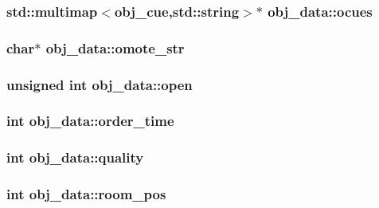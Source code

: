 \hypertarget{structobj__data_a9252063584afada9689c7b3fcdee0494}{
\subsubsection[{ocues}]{\setlength{\rightskip}{0pt plus 5cm}std\-::multimap$<${\bf obj\-\_\-cue},std\-::string$>$$\ast$ obj\-\_\-data\-::ocues}}\label{structobj__data_a9252063584afada9689c7b3fcdee0494}
\hypertarget{structobj__data_a45db6db8ab608ea8479fe23b6654e180}{
\subsubsection[{omote\-\_\-str}]{\setlength{\rightskip}{0pt plus 5cm}char$\ast$ obj\-\_\-data\-::omote\-\_\-str}}\label{structobj__data_a45db6db8ab608ea8479fe23b6654e180}
\hypertarget{structobj__data_aa4f93073a1bd334c269688ddf18847dd}{
\subsubsection[{open}]{\setlength{\rightskip}{0pt plus 5cm}unsigned int obj\-\_\-data\-::open}}\label{structobj__data_aa4f93073a1bd334c269688ddf18847dd}
\hypertarget{structobj__data_a882013eee406f79b916041750a9d3820}{
\subsubsection[{order\-\_\-time}]{\setlength{\rightskip}{0pt plus 5cm}int obj\-\_\-data\-::order\-\_\-time}}\label{structobj__data_a882013eee406f79b916041750a9d3820}
\hypertarget{structobj__data_ac3b63e6e55780379997d9d8011e91ca9}{
\subsubsection[{quality}]{\setlength{\rightskip}{0pt plus 5cm}int obj\-\_\-data\-::quality}}\label{structobj__data_ac3b63e6e55780379997d9d8011e91ca9}
\hypertarget{structobj__data_ad81f045b9e5411f0686f0d33bb41a389}{
\subsubsection[{room\-\_\-pos}]{\setlength{\rightskip}{0pt plus 5cm}int obj\-\_\-data\-::room\-\_\-pos}}\label{structobj__data_ad81f045b9e5411f0686f0d33bb41a389}
